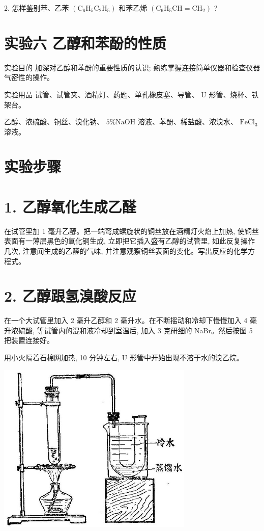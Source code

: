 \documentclass[10pt]{article}
\begin{document}
2. 怎样鉴别苯、乙苯 \(\left( {{\mathrm{C}}_{6}{\mathrm{H}}_{5}{\mathrm{C}}_{2}{\mathrm{H}}_{5}}\right)\) 和苯乙烯 \(\left( {{\mathrm{C}}_{6}{\mathrm{H}}_{5}\mathrm{{CH}} = {\mathrm{{CH}}}_{2}}\right)\) ?

\section*{实验六 乙醇和苯酚的性质}

实验目的 加深对乙醇和苯酚的重要性质的认识; 熟练掌握连接简单仪器和检查仪器气密性的操作。

实验用品 试管、试管夹、酒精灯、药匙、单孔橡皮塞、导管、 \(\mathrm{U}\) 形管、烧杯、铁架台。

乙醇、浓硫酸、铜丝、溴化钠、 \(5\% \mathrm{{NaOH}}\) 溶液、苯酚、稀盐酸、浓溴水、 \({\mathrm{{FeCl}}}_{3}\) 溶液。

\section*{实验步骤}

\section*{1. 乙醇氧化生成乙醛}

在试管里加 1 毫升乙醇。把一端弯成螺旋状的铜丝放在酒精灯火焰上加热, 使铜丝表面有一薄层黑色的氧化铜生成, 立即把它插入盛有乙醇的试管里, 如此反复操作几次, 注意闻生成的乙醛的气味, 并注意观察铜丝表面的变化。写出反应的化学方程式。

\section*{2. 乙醇跟氢溴酸反应}

在一个大试管里加入 2 毫升乙醇和 2 毫升水。在不断摇动和冷却下慢慢加入 4 毫升浓硫酸, 等试管内的混和液冷却到室温后, 加入 3 克研细的 NaBr。然后按图 5 把装置连接好。

用小火隔着石棉网加热, 10 分钟左右, U 形管中开始出现不溶于水的溴乙烷。

\begin{center}
\includegraphics[max width=0.7\textwidth]{images/01912d16-be99-77bb-9535-4f3ed8d9946f_217_502999.jpg}
\end{center}
\end{document}
